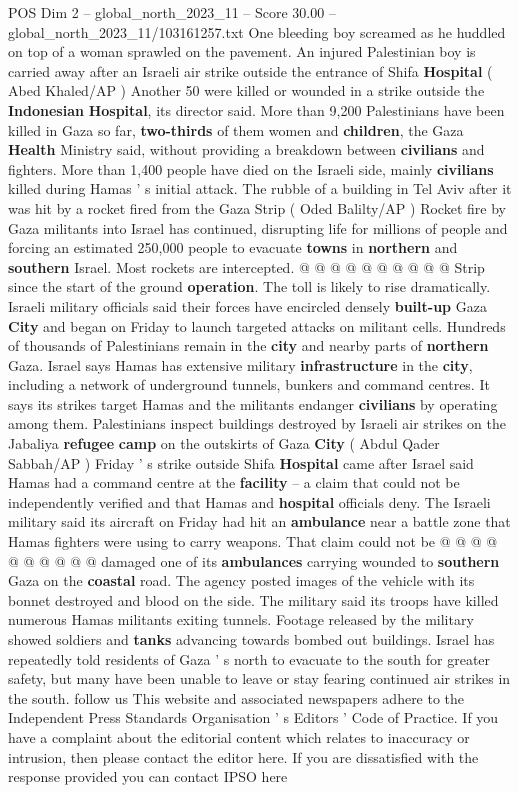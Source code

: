 \begin{textsample}{POS Dim 2 – global\_north\_2023\_11 – Score 30.00 – global\_north\_2023\_11/103161257.txt}
One bleeding boy screamed as he huddled on top of a woman sprawled on the pavement.
An injured Palestinian boy is carried away after an Israeli air strike outside the entrance of Shifa \textbf{Hospital} ( Abed Khaled/AP ) Another 50 were killed or wounded in a strike outside the \textbf{Indonesian} \textbf{Hospital}, its director said.
More than 9,200 Palestinians have been killed in Gaza so far, \textbf{two-thirds} of them women and \textbf{children}, the Gaza \textbf{Health} Ministry said, without providing a breakdown between \textbf{civilians} and fighters.
More than 1,400 people have died on the Israeli side, mainly \textbf{civilians} killed during Hamas ' s initial attack.
The rubble of a building in Tel Aviv after it was hit by a rocket fired from the Gaza Strip ( Oded Balilty/AP ) Rocket fire by Gaza militants into Israel has continued, disrupting life for millions of people and forcing an estimated 250,000 people to evacuate \textbf{towns} in \textbf{northern} and \textbf{southern} Israel.
Most rockets are intercepted. @ @ @ @ @ @ @ @ @ @ Strip since the start of the ground \textbf{operation}.
The toll is likely to rise dramatically.
Israeli military officials said their forces have encircled densely \textbf{built-up} Gaza \textbf{City} and began on Friday to launch targeted attacks on militant cells.
Hundreds of thousands of Palestinians remain in the \textbf{city} and nearby parts of \textbf{northern} Gaza.
Israel says Hamas has extensive military \textbf{infrastructure} in the \textbf{city}, including a network of underground tunnels, bunkers and command centres.
It says its strikes target Hamas and the militants endanger \textbf{civilians} by operating among them.
Palestinians inspect buildings destroyed by Israeli air strikes on the Jabaliya \textbf{refugee} \textbf{camp} on the outskirts of Gaza \textbf{City} ( Abdul Qader Sabbah/AP ) Friday ' s strike outside Shifa \textbf{Hospital} came after Israel said Hamas had a command centre at the \textbf{facility} -- a claim that could not be independently verified and that Hamas and \textbf{hospital} officials deny.
The Israeli military said its aircraft on Friday had hit an \textbf{ambulance} near a battle zone that Hamas fighters were using to carry weapons.
That claim could not be @ @ @ @ @ @ @ @ @ @ damaged one of its \textbf{ambulances} carrying wounded to \textbf{southern} Gaza on the \textbf{coastal} road.
The agency posted images of the vehicle with its bonnet destroyed and blood on the side.
The military said its troops have killed numerous Hamas militants exiting tunnels.
Footage released by the military showed soldiers and \textbf{tanks} advancing towards bombed out buildings.
Israel has repeatedly told residents of Gaza ' s north to evacuate to the south for greater safety, but many have been unable to leave or stay fearing continued air strikes in the south. follow us This website and associated newspapers adhere to the Independent Press Standards Organisation ' s Editors ' Code of Practice.
If you have a complaint about the editorial content which relates to inaccuracy or intrusion, then please contact the editor here.
If you are dissatisfied with the response provided you can contact IPSO here


\end{textsample}
